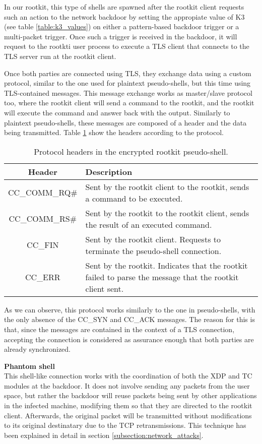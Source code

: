 In our rootkit, this type of shells are spawned after the rootkit client requests such an action to the network backdoor by setting the appropiate value of K3 (see table \ref{table:k3_values}) on either a pattern-based backdoor trigger or a multi-packet trigger. Once such a trigger is received in the backdoor, it will request to the rootkti user process to execute a TLS client that connects to the TLS server run at the rootkit client. 

Once both parties are connected using TLS, they exchange data using a custom protocol, similar to the one used for plaintext pseudo-shells, but this time using TLS-contained messages. This message exchange works as master/slave protocol too, where the rootkit client will send a command to the rootkit, and the rootkit will execute the command and answer back with the output. Similarly to plaintext pseudo-shells, these messages are composed of a header and the data being transmitted. Table \ref{table:eps_headers} show the headers according to the protocol.

\begin{table}[htbp]
\begin{tabular}{|c|>{\centering\arraybackslash}p{8cm}|}
\hline
\textbf{Header} & \textbf{Description}\\
\hline
\hline
CC\_COMM\_RQ\# & Sent by the rootkit client to the rootkit, sends a command to be executed.\\
\hline
CC\_COMM\_RS\# & Sent by the rootkit to the rootkit client, sends the result of an executed command.\\
\hline
CC\_FIN & Sent by the rootkit client. Requests to terminate the pseudo-shell connection.\\
\hline
CC\_ERR & Sent by the rootkit. Indicates that the rootkit failed to parse the message that the rootkit client sent.\\
\hline
\end{tabular}
\caption{Protocol headers in the encrypted rootkit pseudo-shell.}
\label{table:eps_headers}
\end{table}

As we can observe, this protocol works similarly to the one in pseudo-shells, with the only absence of the CC\_SYN and CC\_ACK messages. The reason for this is that, since the messages are contained in the context of a TLS connection, accepting the connection is considered as assurance enough that both parties are already synchronized.



\textbf{Phantom shell}\\
This shell-like connection works with the coordination of both the XDP and TC modules at the backdoor. It does not involve sending any packets from the user space, but rather the backdoor will reuse packets being sent by other applications in the infected machine, modifying them so that they are directed to the rootkit client. Afterwards, the original packet will be transmitted without modifications to its original destinatary due to the TCP retransmissions. This technique has been explained in detail in section \ref{subsection:network_attacks}.

